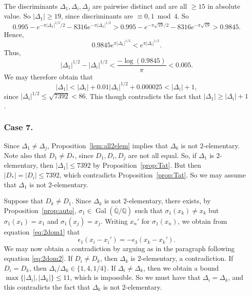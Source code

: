 \documentclass[12pt,a4paper,oneside]{amsart}
\DeclareMathOperator{\gal}{Gal}
\begin{document}
The discriminants $\Delta_1, \Delta_i, \Delta_j$ are pairwise distinct and are all $\geq 15$ in absolute value. So $\lvert \Delta_1 \rvert \geq 19$, since discriminants are $\equiv 0, 1 \bmod 4$. So
\[ 0.995 - e^{- \pi \lvert \Delta_1 \rvert^{1/2} /2} -8316 e^{- \pi \lvert \Delta_1 \rvert^{1/2}} > 0.995 - e^{- \pi \sqrt{19}/2} -8316 e^{-\pi \sqrt{19}} > 0.9845.\]
Hence,
\[ 0.9845 e^{\pi \lvert \Delta_1 \rvert^{1/2}} < e^{\pi \lvert \Delta_i \rvert^{1/2}}.\]
Thus,
\[ \lvert \Delta_1 \rvert^{1/2} - \lvert \Delta_i \rvert^{1/2} < \frac{- \log(0.9845)}{\pi} < 0.005.\]
We may therefore obtain that
\[ \lvert \Delta_1 \rvert < \lvert \Delta_i \rvert + 0.01 \lvert \Delta_i \rvert^{1/2} + 0.000025 < \lvert \Delta_i \rvert + 1,\]
since $\lvert \Delta_i \rvert^{1/2} \leq \sqrt{7392} < 86$. This though contradicts the fact that $\lvert \Delta_1 \rvert \geq \lvert \Delta_i \rvert + 1$.

\subsubsection{Case 7.} Since $\Delta_1 \neq \Delta_j$, Proposition~\ref{lem:all2elem} implies that $\Delta_k$ is not $2$-elementary. Note also that $D_1 \neq D_*$, since $D_1, D_i, D_j$ are not all equal. So, if $\Delta_1$ is $2$-elementary, then $\lvert \Delta_1 \rvert \leq 7392$ by Proposition~\ref{prop:Tat}. But then $\lvert D_* \rvert = \lvert D_i \rvert \leq 7392$, which contradicts Proposition~\ref{prop:Tat}. So we may assume that $\Delta_1$ is not $2$-elementary. 

Suppose that $D_k \neq D_1$. 
Since $\Delta_k$ is not $2$-elementary, there exists, by Proposition~\ref{prop:auto}, $\sigma_1 \in \gal(\overline{\mathbb{Q}} / \mathbb Q)$ such that $\sigma_1(x_k) \neq x_k$ but $\sigma_1(x_1) = x_1$ and $\sigma_1(x_j) = x_j$. Writing $x_n'$ for $\sigma_1(x_n)$, we obtain from equation~\eqref{eq:2dom1} that
\[ \epsilon_1 (x_i - x_i') = -\epsilon_3 (x_k - x_k').\]
We may now obtain a contradiction by arguing as in the paragraph following equation \eqref{eq:2dom2}. If $D_i \neq D_k$, then $\Delta_k$ is $2$-elementary, a contradiction. If $D_i = D_k$, then $\Delta_i / \Delta_k \in \{1, 4, 1/4\}$. If $\Delta_i \neq \Delta_k$, then we obtain a bound $\max \{ \lvert \Delta_i \rvert, \lvert \Delta_k \rvert\} \leq 11$, which is impossible. So we must have that $\Delta_i = \Delta_k$, and this contradicts the fact that $\Delta_k$ is not $2$-elementary. 
\end{document}
